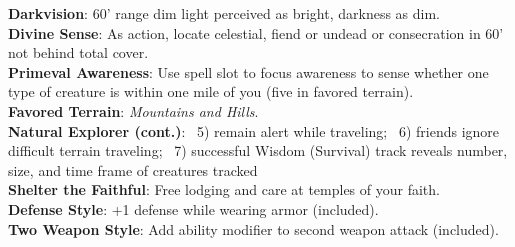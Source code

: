 \documentclass[11pt]{article}
\newcommand{\heading}[1]{{\sc\bfseries #1}}
\begin{document}
{%
\heading{Darkvision}: 60' range dim light perceived as bright, darkness as dim.
\\[4pt]
\heading{Divine Sense}: As action, locate celestial, fiend or undead or consecration in 60' not behind total cover.
\\[4pt]
\heading{Primeval Awareness}: Use spell slot to focus awareness to sense whether one type of creature is within one mile of you (five in favored terrain).
\\[4pt]
\heading{Favored Terrain}: {\it Mountains and Hills}.
\\[4pt]
\heading{Natural Explorer (cont.)}:
\ 5) remain alert while traveling;
\ 6) friends ignore difficult terrain traveling;
\ 7) successful Wisdom (Survival) track reveals number, size, and time frame of creatures tracked
\\[8pt]
%
\heading{Shelter the Faithful}: Free lodging and care at temples of your faith.
\\[4pt]
\heading{Defense Style}: +1 defense while wearing armor (included).
\\[4pt]
\heading{Two Weapon Style}: Add ability modifier to second weapon attack (included).
\\[4pt]

}
\end{document}
